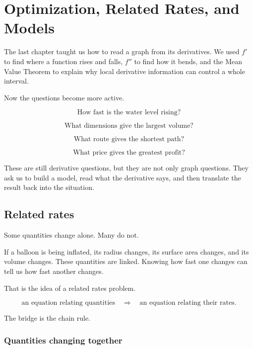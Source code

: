 
\chapter{Optimization, Related Rates, and Models}
\label{chap:optimization-related-rates-models}

The last chapter taught us how to read a graph from its derivatives.  We used \(f'\) to
find where a function rises and falls, \(f''\) to find how it bends, and the Mean Value
Theorem to explain why local derivative information can control a whole interval.

Now the questions become more active.

\[
\text{How fast is the water level rising?}
\]

\[
\text{What dimensions give the largest volume?}
\]

\[
\text{What route gives the shortest path?}
\]

\[
\text{What price gives the greatest profit?}
\]

These are still derivative questions, but they are not only graph questions.  They ask us
to build a model, read what the derivative says, and then translate the result back into
the situation.

\section{Related rates}
\label{sec:related-rates}

Some quantities change alone.  Many do not.

If a balloon is being inflated, its radius changes, its surface area changes, and its volume
changes.  These quantities are linked.  Knowing how fast one changes can tell us how
fast another changes.

That is the idea of a related rates problem.

\[
\text{an equation relating quantities}
\quad\Longrightarrow\quad
\text{an equation relating their rates}.
\]

The bridge is the chain rule.

\subsection{Quantities changing together}
\label{subsec:quantities-changing-together}


